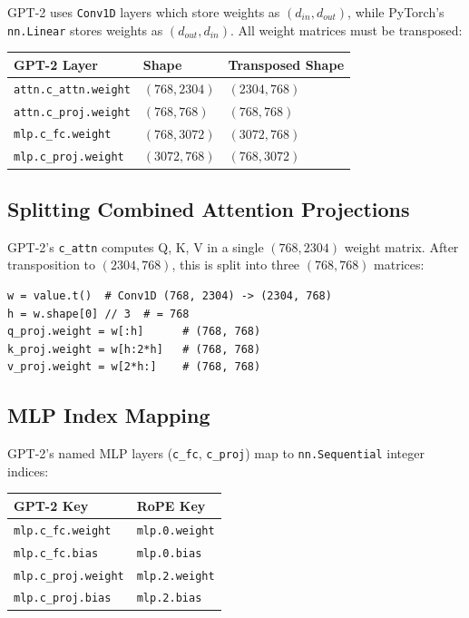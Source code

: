 \documentclass[11pt, a4paper]{article}
\begin{document}
GPT-2 uses \texttt{Conv1D} layers which store weights as $(d_{in}, d_{out})$, while PyTorch's \texttt{nn.Linear} stores weights as $(d_{out}, d_{in})$. All weight matrices must be transposed:

\begin{center}
\begin{tabular}{lll}
\toprule
\textbf{GPT-2 Layer} & \textbf{Shape} & \textbf{Transposed Shape} \\
\midrule
\texttt{attn.c\_attn.weight} & $(768, 2304)$ & $(2304, 768)$ \\
\texttt{attn.c\_proj.weight} & $(768, 768)$ & $(768, 768)$ \\
\texttt{mlp.c\_fc.weight} & $(768, 3072)$ & $(3072, 768)$ \\
\texttt{mlp.c\_proj.weight} & $(3072, 768)$ & $(768, 3072)$ \\
\bottomrule
\end{tabular}
\end{center}

\subsection{Splitting Combined Attention Projections}

GPT-2's \texttt{c\_attn} computes Q, K, V in a single $(768, 2304)$ weight matrix. After transposition to $(2304, 768)$, this is split into three $(768, 768)$ matrices:

\begin{lstlisting}[style=pythonstyle, caption={Splitting combined c\_attn into separate Q, K, V projections}]
w = value.t()  # Conv1D (768, 2304) -> (2304, 768)
h = w.shape[0] // 3  # = 768
q_proj.weight = w[:h]      # (768, 768)
k_proj.weight = w[h:2*h]   # (768, 768)
v_proj.weight = w[2*h:]    # (768, 768)
\end{lstlisting}

\subsection{MLP Index Mapping}

GPT-2's named MLP layers (\texttt{c\_fc}, \texttt{c\_proj}) map to \texttt{nn.Sequential} integer indices:

\begin{center}
\begin{tabular}{ll}
\toprule
\textbf{GPT-2 Key} & \textbf{RoPE Key} \\
\midrule
\texttt{mlp.c\_fc.weight} & \texttt{mlp.0.weight} \\
\texttt{mlp.c\_fc.bias} & \texttt{mlp.0.bias} \\
\texttt{mlp.c\_proj.weight} & \texttt{mlp.2.weight} \\
\texttt{mlp.c\_proj.bias} & \texttt{mlp.2.bias} \\
\bottomrule
\end{tabular}
\end{center}
\end{document}
